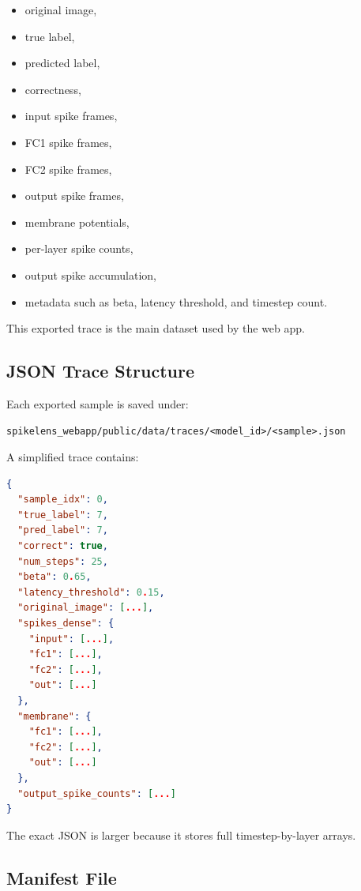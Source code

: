 \documentclass[11pt,a4paper]{article}
\begin{document}
\begin{itemize}
    \item original image,
    \item true label,
    \item predicted label,
    \item correctness,
    \item input spike frames,
    \item FC1 spike frames,
    \item FC2 spike frames,
    \item output spike frames,
    \item membrane potentials,
    \item per-layer spike counts,
    \item output spike accumulation,
    \item metadata such as beta, latency threshold, and timestep count.
\end{itemize}

This exported trace is the main dataset used by the web app.

\subsection{JSON Trace Structure}

Each exported sample is saved under:

\begin{lstlisting}
spikelens_webapp/public/data/traces/<model_id>/<sample>.json
\end{lstlisting}

A simplified trace contains:

\begin{lstlisting}[language=json]
{
  "sample_idx": 0,
  "true_label": 7,
  "pred_label": 7,
  "correct": true,
  "num_steps": 25,
  "beta": 0.65,
  "latency_threshold": 0.15,
  "original_image": [...],
  "spikes_dense": {
    "input": [...],
    "fc1": [...],
    "fc2": [...],
    "out": [...]
  },
  "membrane": {
    "fc1": [...],
    "fc2": [...],
    "out": [...]
  },
  "output_spike_counts": [...]
}
\end{lstlisting}

The exact JSON is larger because it stores full timestep-by-layer arrays.

\subsection{Manifest File}
\end{document}

